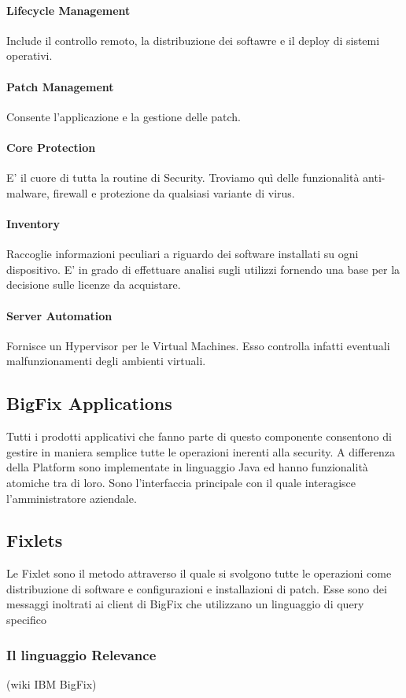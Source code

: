 \paragraph{Lifecycle Management}
Include il controllo remoto, la distribuzione dei softawre e il deploy di sistemi operativi.
\paragraph{Patch Management}
Consente l'applicazione e la gestione delle patch.
\paragraph{Core Protection}
E' il cuore di tutta la routine di Security. Troviamo quì delle funzionalità anti-malware, firewall e protezione da qualsiasi variante di virus.
\paragraph{Inventory }
Raccoglie informazioni peculiari a riguardo dei software installati su ogni dispositivo. E' in grado di effettuare analisi sugli utilizzi fornendo una base per la decisione sulle licenze da acquistare.
\paragraph{Server Automation}
Fornisce un Hypervisor per le Virtual Machines. Esso controlla infatti eventuali malfunzionamenti degli ambienti virtuali.
\subsection{BigFix Applications}
Tutti i prodotti applicativi che fanno parte di questo componente consentono di gestire in maniera semplice tutte le operazioni inerenti alla security. A differenza della Platform sono implementate in linguaggio Java ed hanno funzionalità atomiche tra di loro. Sono l'interfaccia principale con il quale interagisce l'amministratore aziendale.
\subsection{Fixlets}
Le Fixlet sono il metodo attraverso il quale si svolgono tutte le operazioni come distribuzione di software e configurazioni e installazioni di patch. Esse sono dei messaggi inoltrati ai client di BigFix che utilizzano un linguaggio di query specifico
\subsubsection{Il linguaggio Relevance}
(wiki IBM BigFix)


